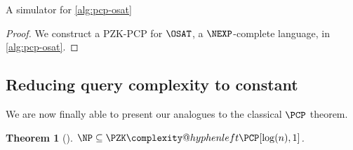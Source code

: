 \documentclass[english,12pt]{reedthesis}
\makeatletter
\theoremstyle{plain}
\newtheorem{thm}{Theorem}[section]
\theoremstyle{definition}
\theoremstyle{remark}
\newcommand{\PZKPCP}{%
  \PZK\complexity@hyphenleft\PCP
}
\makeatother
\begin{document}
\begin{algorithm}[htbp]
  \caption{A simulator for \cref{alg:pcp-osat}~\cite[Construction 6.7]{GOS25}}\label{alg:pcp-osat-sim}
\end{algorithm}

\begin{proof}
  We construct a PZK-PCP for $\OSAT$, a $\NEXP$-complete language, in
  \cref{alg:pcp-osat}.
\end{proof}

\subsection{Reducing query complexity to constant}\label{sec:constant-pcp-np}

We are now finally able to present our analogues to the classical $\PCP$
theorem.

\begin{thm}[{\cite[Theorem 2]{GOS25}}]\label{thm:zk-pcp}
  $\NP \subseteq \PZKPCP[\log(n), 1]$.
\end{thm}
\end{document}
